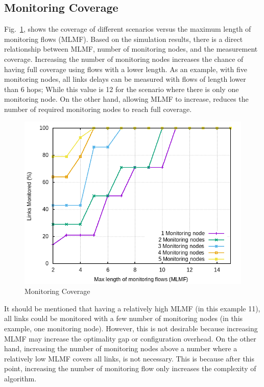 \documentclass[10pt, journal, letterpaper]{IEEEtran}
\begin{document}
\subsection{Monitoring Coverage}\label{subsec:eval_coverage}
Fig.~\ref{fig:eval_Abilene_Max_Length_of_Routes_Links_Monitored}, shows the coverage of different scenarios versus the maximum length of monitoring flows (MLMF). Based on the simulation results, there is a direct relationship between MLMF, number of monitoring nodes, and the measurement coverage. Increasing the number of monitoring nodes increases the chance of having full coverage using flows with a lower length. As an example, with five monitoring nodes, all links delays can be measured with flows of length lower than 6 hops; While this value is 12 for the scenario where there is only one monitoring node.
On the other hand, allowing MLMF to increase, reduces the number of required monitoring nodes to reach full coverage. 
\begin{figure}[!b]
    \centering
    \includegraphics[width=0.8\columnwidth]{img/eval_Abilene_Max_Length_of_Routes_Links_Monitored.png}
    \caption{Monitoring Coverage}
    \label{fig:eval_Abilene_Max_Length_of_Routes_Links_Monitored}
\end{figure}
It should be mentioned that having a relatively high MLMF (in this example 11), all links could be monitored with a few number of monitoring nodes (in this example, one monitoring node). However, this is not desirable because increasing MLMF may increase the optimality gap or configuration overhead. On the other hand, increasing the number of monitoring nodes above a number where a relatively low MLMF covers all links, is not necessary. This is because after this point, increasing the number of monitoring flow only increases the complexity of algorithm. 
\end{document}
